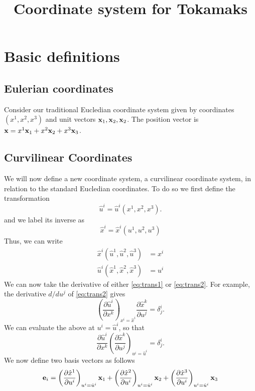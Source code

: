 \documentclass[11pt]{article}
\title{Coordinate system for Tokamaks}
\newcommand{\uhat}{\hat{u}}
\newcommand{\xhat}{\hat{x}}
\begin{document}
\maketitle

\section{Basic definitions}
\subsection{Eulerian coordinates}
Consider our traditional Eucledian coordinate system given by coordinates $(x^1,x^2,x^3)$ and unit vectors $\mathbf{x}_1, \mathbf{x}_2, \mathbf{x}_2$. The position vector is $\mathbf{x} = x^1 \mathbf{x}_1 + x^2 \mathbf{x}_2 + x^3 \mathbf{x}_3$.

\subsection{Curvilinear Coordinates}
We will now define a new coordinate system, a curvilinear coordinate system, in relation to the standard Eucledian coordinates. To do so we first define the transformation 
\begin{equation}
\uhat^i = \uhat^i(x^1, x^2, x^3) .
\end{equation}
and we label its inverse as
\begin{equation}
\xhat^i = \xhat^i(u^1,u^2,u^3)
\end{equation}
Thus, we can write 
\begin{align}
    \xhat^i(\uhat^1, \uhat^2, \uhat^3) &= x^i \label{eq:trans1}\\
    \uhat^i(\xhat^1, \xhat^2, \xhat^3) &= u^i \label{eq:trans2}
\end{align}
We can now take the derivative of either \cref{eq:trans1} or \cref{eq:trans2}. For example, the derivative $d/du^j$ of \cref{eq:trans2} gives
\begin{equation}
    \left ( \frac{\partial \uhat^i}{\partial x^k} \right)_{x^i = \xhat^i} \frac{\partial \xhat^k}{\partial u^j} = \delta^i_j.
\end{equation}
We can evaluate the above at $u^i = \hat{u}^i$, so that
\begin{equation}
     \frac{\partial \uhat^i}{\partial x^k} \left( \frac{\partial \xhat^k}{\partial u^j} \right)_{u^i = \hat{u}^i} = \delta^i_j.
\end{equation}
We now define two basis vectors as follows
\begin{equation}
\label{eq:basis_sub}
    \evec_i = \left ( \frac{ \partial \xhat^1}{\partial u^i} \right)_{u^i = \hat{u}^i} \xvec_1 + \left ( \frac{ \partial \xhat^2}{\partial u^i} \right)_{u^i = \hat{u}^i} \xvec_2 + \left ( \frac{ \partial \xhat^3}{\partial u^i} \right)_{u^i = \hat{u}^i} \xvec_3
\end{equation}
\end{document}
